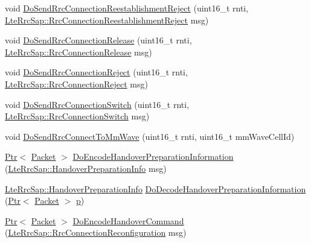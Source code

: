 \begin{DoxyCompactItemize}
\item 
void \hyperlink{classns3_1_1MmWaveLteEnbRrcProtocolReal_af6a55ec85a43cb758c94d192027eacc1}{Do\+Send\+Rrc\+Connection\+Reestablishment\+Reject} (uint16\+\_\+t rnti, \hyperlink{structns3_1_1LteRrcSap_1_1RrcConnectionReestablishmentReject}{Lte\+Rrc\+Sap\+::\+Rrc\+Connection\+Reestablishment\+Reject} msg)
\item 
void \hyperlink{classns3_1_1MmWaveLteEnbRrcProtocolReal_a90b4b03b615cfe638e8d12cd72944d92}{Do\+Send\+Rrc\+Connection\+Release} (uint16\+\_\+t rnti, \hyperlink{structns3_1_1LteRrcSap_1_1RrcConnectionRelease}{Lte\+Rrc\+Sap\+::\+Rrc\+Connection\+Release} msg)
\item 
void \hyperlink{classns3_1_1MmWaveLteEnbRrcProtocolReal_a6aad344d32429e633db33040f847844c}{Do\+Send\+Rrc\+Connection\+Reject} (uint16\+\_\+t rnti, \hyperlink{structns3_1_1LteRrcSap_1_1RrcConnectionReject}{Lte\+Rrc\+Sap\+::\+Rrc\+Connection\+Reject} msg)
\item 
void \hyperlink{classns3_1_1MmWaveLteEnbRrcProtocolReal_a827ecef7d4d0bcd1c0ecba579862320b}{Do\+Send\+Rrc\+Connection\+Switch} (uint16\+\_\+t rnti, \hyperlink{structns3_1_1LteRrcSap_1_1RrcConnectionSwitch}{Lte\+Rrc\+Sap\+::\+Rrc\+Connection\+Switch} msg)
\item 
void \hyperlink{classns3_1_1MmWaveLteEnbRrcProtocolReal_a9a7f93636f0cce7e40b293445a4f8335}{Do\+Send\+Rrc\+Connect\+To\+Mm\+Wave} (uint16\+\_\+t rnti, uint16\+\_\+t mm\+Wave\+Cell\+Id)
\item 
\hyperlink{classns3_1_1Ptr}{Ptr}$<$ \hyperlink{classns3_1_1Packet}{Packet} $>$ \hyperlink{classns3_1_1MmWaveLteEnbRrcProtocolReal_a2927abd3df1f0b041dcc61d1486c7271}{Do\+Encode\+Handover\+Preparation\+Information} (\hyperlink{structns3_1_1LteRrcSap_1_1HandoverPreparationInfo}{Lte\+Rrc\+Sap\+::\+Handover\+Preparation\+Info} msg)
\item 
\hyperlink{structns3_1_1LteRrcSap_1_1HandoverPreparationInfo}{Lte\+Rrc\+Sap\+::\+Handover\+Preparation\+Info} \hyperlink{classns3_1_1MmWaveLteEnbRrcProtocolReal_ae7f9bc672b29e0e83a97f0ccda4017a9}{Do\+Decode\+Handover\+Preparation\+Information} (\hyperlink{classns3_1_1Ptr}{Ptr}$<$ \hyperlink{classns3_1_1Packet}{Packet} $>$ \hyperlink{lte__link__budget__x2__handover__measures_8m_ac9de518908a968428863f829398a4e62}{p})
\item 
\hyperlink{classns3_1_1Ptr}{Ptr}$<$ \hyperlink{classns3_1_1Packet}{Packet} $>$ \hyperlink{classns3_1_1MmWaveLteEnbRrcProtocolReal_ac608493e5a32e6b5d5008964ca5c8cc1}{Do\+Encode\+Handover\+Command} (\hyperlink{structns3_1_1LteRrcSap_1_1RrcConnectionReconfiguration}{Lte\+Rrc\+Sap\+::\+Rrc\+Connection\+Reconfiguration} msg)

\end{DoxyCompactItemize}
